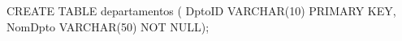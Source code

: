 \lstset{caption=Crear tabla ``departamentos'',label=sql:crearTablaDepartamentos}
\begin{SQL}
CREATE TABLE departamentos (
DptoID VARCHAR(10) PRIMARY KEY,
NomDpto VARCHAR(50) NOT NULL);
\end{SQL}